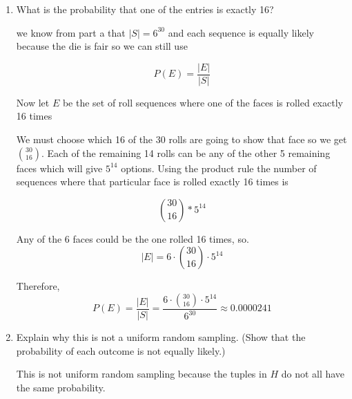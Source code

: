 \documentclass[10pt,letterpaper,unboxed,cm]{article}
\begin{document}
\begin{enumerate}
\begin{enumerate}
\[P(E) = \frac{|E|}{|S|}\]

Now let \(i\) be the integers \(1-6\) where \(A_i\) is the set of roll sequences where the face \(i\) is never rolled. Then the event that at least one entry is 0 is the union of these sets

\[E = A_1 \cup A_2 \cup A_3 \cup A_4 \cup A_5 \cup A_6\]

We will use PIE(Inclusion-Exclusion) to count this union. If a given set of $k$ faces is never rolled, then each of the 30 rolls has only $6-k$ options, so any intersection of $k$ of the $A_i$'s has size $(6-k)^{30}$. There are $\binom{6}{k}$ ways to choose which $k$ faces are missing. So by PIE,
\[|E| = \binom{6}{1}5^{30} - \binom{6}{2}4^{30} + \binom{6}{3}3^{30} - \binom{6}{4}2^{30} + \binom{6}{5}1^{30} - \binom{6}{6}0^{30}\]
\[= 6 \cdot 5^{30} - 15 \cdot 4^{30} + 20 \cdot 3^{30} - 15 \cdot 2^{30} + 6 \cdot 1^{30} - 0\]


Therefore,
\[P(E) = \frac{|E|}{|S|} = \frac{6 \cdot 5^{30} - 15 \cdot 4^{30} + 20 \cdot 3^{30} - 15 \cdot 2^{30} + 6 \cdot 1^{30}}{6^{30}} \approx 0.0252\]

\item
What is the probability that one of the entries is exactly 16?

we know from part a that \(|S| = 6^{30}\) and each sequence is equally likely because the die is fair so we can still use 

\[P(E) = \frac{|E|}{|S|}\]


Now let \(E\) be the set of roll sequences where one of the faces is rolled exactly 16 times

We must choose which 16 of the 30 rolls are going to show that face so we get \(\binom{30}{16}\). Each of the remaining 14 rolls can be any of the other 5 remaining faces which will give \(5^{14}\) options. Using the product rule the number of sequences where that particular face is rolled exactly 16 times is 

\[\binom{30}{16} * 5^{14}\]

Any of the 6 faces could be the one rolled 16 times, so.
\[|E| = 6 \cdot \binom{30}{16} \cdot 5^{14}\]

Therefore,
\[P(E) = \frac{|E|}{|S|} = \frac{6 \cdot \binom{30}{16} \cdot 5^{14}}{6^{30}} \approx 0.0000241\]
\item
Explain why this is not a uniform random sampling. (Show that the probability of
each outcome is not equally likely.)

This is not uniform random sampling because the tuples in $H$ do not all have the same probability.


\end{enumerate}
\end{enumerate}
\end{document}
